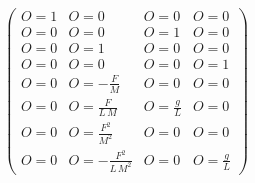 \begin{equation}
\left(\begin{array}{cccc} O=1 & O=0 & O=0 & O=0\\ O=0 & O=0 & O=1 & O=0\\ O=0 & O=1 & O=0 & O=0\\ O=0 & O=0 & O=0 & O=1\\ O=0 & O=-\frac{F}{M} & O=0 & O=0\\ O=0 & O=\frac{F}{L\,M} & O=\frac{g}{L} & O=0\\ O=0 & O=\frac{F^2}{M^2} & O=0 & O=0\\ O=0 & O=-\frac{F^2}{L\,M^2} & O=0 & O=\frac{g}{L} \end{array}\right)
\end{equation}
